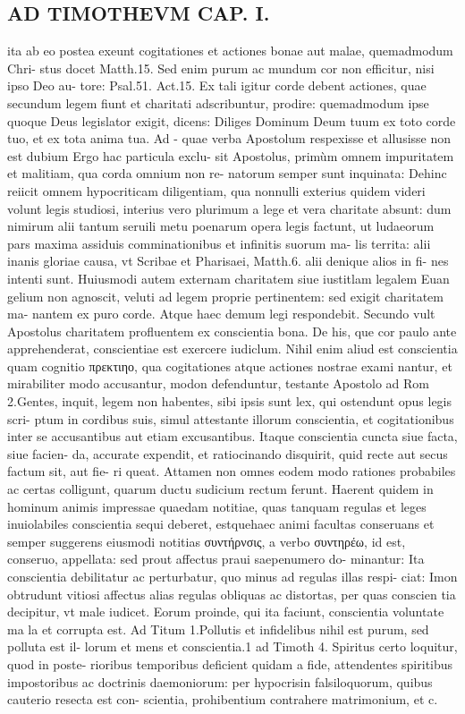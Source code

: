 \documentclass{article}
\begin{document}
\begin{pages}
\section*{AD TIMOTHEVM CAP. I. }
\marginpar{[ p.22 ]}\pstart ita ab eo postea exeunt cogitationes et actiones bonae aut malae, quemadmodum Chri- stus docet Matth.15. Sed enim purum ac mundum cor non efficitur, nisi ipso Deo au- tore: Psal.51. Act.15. Ex tali igitur corde debent actiones, quae secundum legem fiunt et charitati adscribuntur, prodire: quemadmodum ipse quoque  Deus legislator exigit, dicens: Diliges Dominum Deum tuum ex toto corde tuo, et ex tota anima tua. Ad - quae verba Apostolum respexisse et allusisse non est dubium Ergo hac particula exclu- sit Apostolus, primùm omnem impuritatem et malitiam, qua corda omnium non re- natorum semper sunt inquinata: Dehinc reiicit omnem hypocriticam diligentiam, qua nonnulli exterius quidem videri volunt legis studiosi, interius vero plurimum a lege et vera charitate absunt: dum nimirum alii tantum seruili metu poenarum opera legis factunt, ut ludaeorum pars maxima assiduis comminationibus et infinitis suorum ma- lis territa: alii inanis gloriae causa, vt Scribae et Pharisaei, Matth.6. alii denique  alios in fi- nes intenti sunt. Huiusmodi autem externam charitatem siue iustitlam legalem Euan gelium non agnoscit, veluti ad legem proprie pertinentem: sed exigit charitatem ma- nantem ex puro corde. Atque  haec demum legi respondebit.  \pend\pstart Secundo vult Apostolus charitatem profluentem ex conscientia bona. De his, que cor paulo ante apprehenderat, conscientiae est exercere iudiclum. Nihil enim aliud est conscientia quam cognitio πρεκτιηο, qua cogitationes atque actiones nostrae exami nantur, et mirabiliter modo accusantur, modon defenduntur, testante Apostolo ad Rom 2.Gentes, inquit, legem non habentes, sibi ipsis sunt lex, qui ostendunt opus legis scri-   ptum in cordibus suis, simul attestante illorum conscientia, et cogitationibus inter se   accusantibus aut etiam excusantibus. Itaque  conscientia cuncta siue facta, siue facien-   da, accurate expendit, et ratiocinando disquirit, quid recte aut secus factum sit, aut fie- ri queat. Attamen non omnes eodem modo rationes probabiles ac certas colligunt, quarum ductu sudicium rectum ferunt. Haerent quidem in hominum animis impressae quaedam notitiae, quas tanquam regulas et leges inuiolabiles conscientia sequi deberet, estquehaec animi facultas conseruans et semper suggerens eiusmodi notitias συντήρνσις, a verbo συντηρέω, id est, conseruo, appellata: sed prout affectus praui saepenumero do- minantur: Ita conscientia debilitatur ac perturbatur, quo minus ad regulas illas respi- ciat: Imon obtrudunt vitiosi affectus alias regulas obliquas ac distortas, per quas conscien tia decipitur, vt male iudicet. Eorum proinde, qui ita faciunt, conscientia voluntate ma la et corrupta est. Ad Titum 1.Pollutis et infidelibus nihil est purum, sed polluta est il- lorum et mens et conscientia.1 ad Timoth 4. Spiritus certo loquitur, quod in poste-   rioribus temporibus deficient quidam a fide, attendentes spiritibus impostoribus ac   doctrinis daemoniorum: per hypocrisin falsiloquorum, quibus cauterio resecta est con-   scientia, prohibentium contrahere matrimonium, et c. 
\end{pages}
\end{document}
